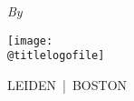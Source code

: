 {\begin{titlepage}
{%
         \ifdimgreater{\ht\@titlebox}{28bp}{\vspace*{3.2bp}}{\vspace*{8.2bp}}%
         \ifx\@subtitle\@empty%
         \else%
            \baselineskip
            {%
             \vspace*{-20bp}}%
            \vspace*{9.2bp}%
         \fi%
         \baselineskip
        {\normalsize\itshape By\par}
        \baselineskip
        \vspace*{-17bp}%
        {\fontsize{14bp}{17bp}\selectfont\@author\par}%
        \vfill
        \IfFileExists{\@titlelogofile}%
           {\texttt{[image: \\@titlelogofile]}\par\vspace*{\baselineskip}}%
           {}
        {\normalsize\scshape LEIDEN\ |\ BOSTON\par}%
      }%
      \if@PhD\else
         \next@tpage
         \begin{addmargin}[-11mm]{-4mm}
         \begin{minipage}[t]{100mm}
            \footnotesize%
            \raggedright%
            \@uppertitleback%
         \end{minipage}%
         \vfill
         \begin{minipage}[b]{130mm}%

\end{minipage}
\end{addmargin}
\end{titlepage}}
